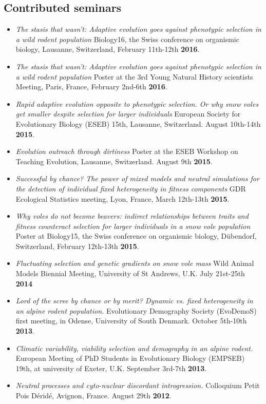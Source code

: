 \documentclass[a4paper,oneside,10pt]{article} %
\begin{document}
\subsection*{Contributed seminars}
\begin{itemize}
\item \textit{The stasis that wasn't: Adaptive evolution goes against phenotypic selection in a wild rodent population} Biology16, the Swiss conference on organismic biology, Lausanne, Switzerland, February 11th-12th \textbf{2016}.
\item \textit{The stasis that wasn't: Adaptive evolution goes against phenotypic selection in a wild rodent population} Poster at the 3rd Young Natural History scientists Meeting, Paris, France, February 2nd-6th \textbf{2016}.
\item \textit{Rapid adaptive evolution opposite to phenotypic selection. Or why snow voles get smaller despite selection for larger individuals} European Society for Evolutionary Biology (ESEB) 15th, Lausanne, Switzerland. August 10th-14th \textbf{2015}.
\item \textit{Evolution outreach through dirtiness} Poster at the ESEB Workshop on Teaching Evolution, Lausanne, Switzerland. August 9th \textbf{2015}.
\item \textit{Successful by chance? The power of mixed models and neutral simulations for the detection of individual fixed heterogeneity in fitness components} GDR Ecological Statistics meeting, Lyon, France, March 12th-13th \textbf{2015}.
\item \textit{Why voles do not become beavers: indirect relationships between traits and fitness counteract selection for larger individuals in a snow vole population} Poster at Biology15, the Swiss conference on organismic biology, D\"{u}bendorf, Switzerland, February 12th-13th \textbf{2015}.
\item \textit{Fluctuating selection and genetic gradients on snow vole mass} Wild Animal Models Biennial Meeting, University of St Andrews, U.K. July 21st-25th \textbf{2014}
\item \textit{Lord of the scree by chance or by merit? Dynamic vs. fixed heterogeneity in an alpine rodent population.} Evolutionary Demography Society (EvoDemoS) first meeting, in Odense, University of South Denmark. October 5th-10th \textbf{2013}.
\item \textit{Climatic variability, viability selection and demography in an alpine rodent.} European Meeting of PhD Students in Evolutionary Biology (EMPSEB) 19th, at university of Exeter, U.K. September 3rd-7th \textbf{2013}.
\item \textit{Neutral processes and cyto-nuclear discordant introgression.} Colloquium Petit Pois D\'{e}rid\'{e}, Avignon, France. August 29th \textbf{2012}.
\end{itemize}
\end{document}
